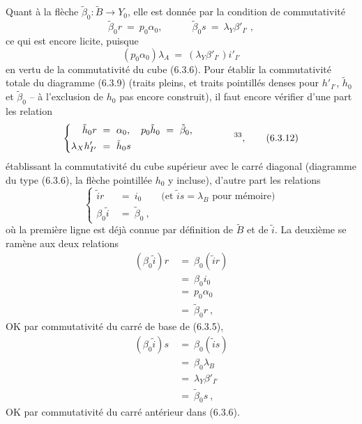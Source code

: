 Quant à la flèche $\tilde{\beta}_0 : \tilde{B} \longrightarrow Y_0$, elle est donnée par la condition de commutativité
\[
\tilde{\beta}_0r \ =\ p_0\alpha_0, \qquad\quad \tilde{\beta}_0s \ =\ \lambda_Y\beta'_{I'}\ ,
\tag*{(6.3.11)}
\]
ce qui est encore licite, puisque
\[
(p_0\alpha_0)\lambda_A \ =\ (\lambda_Y\beta'_{I'})i'_{I'}
\]
en vertu de la commutativité du cube (6.3.6). Pour établir la commutativité totale du diagramme (6.3.9) (traits pleins, et traits pointillés denses pour $h'_{I'}$, $\tilde{h}_0$ et $\tilde{\beta}_0$ -- à l'exclusion de $h_0$ pas encore construit), il faut encore vérifier d'une part les relation %
\[
\left\{
\begin{aligned}
\tilde{h}_0r \ &=\ \alpha_0, \quad p_0\tilde{h}_0 \ =\ \tilde{\beta}_0, \\
\lambda_X h'_{I'} \ &=\ \tilde{h}_0s
\end{aligned}
\right.
\qquad\qquad \text{\footnotemark[33]},
\tag*{(6.3.12)}
\]
établissant la commutativité du cube supérieur avec le carré diagonal (diagramme du type (6.3.6), la flèche pointillée $h_0$ y incluse), d'autre part les relations
\[
\left\{
\begin{aligned}
\tilde{i}r \ &=\ i_0 \qquad \text{(et $\tilde{i}s = \lambda_B$ pour mémoire)} \\
\beta_0\tilde{i} \ &=\ \tilde{\beta}_0\ ,
\end{aligned}
\right.
\tag*{(6.3.13)}
\]
où la première ligne est déjà connue par définition de $\tilde{B}$ et de $\tilde{i}$. La deuxième
se ramène aux deux relations
\[
\begin{aligned}
(\beta_0\tilde{i})r \ &=\ \beta_0(\tilde{i}r) \\
&=\ \beta_0i_0 \\
&=\ p_0\alpha_0 \\
&=\ \tilde{\beta}_0r\ ,
\end{aligned}
\]
OK par commutativité du carré de base de (6.3.5),
\[
\begin{aligned}
(\beta_0\tilde{i})s \ &=\ \beta_0(\tilde{i}s) \\
&=\ \beta_0\lambda_B \\
&=\ \lambda_Y\beta'_{I'} \\
&=\ \tilde{\beta}_0s\ ,
\end{aligned}
\]
OK par commutativité du carré antérieur dans (6.3.6).

